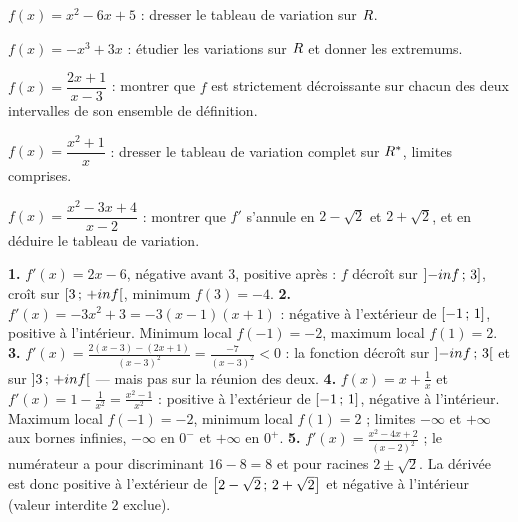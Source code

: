 \begin{entrainement}[variations]
\exo[\niveau{1}] $f(x) = x^{2}-6x+5$ : dresser le tableau de variation sur
$R$.

\exo[\niveau{2}] $f(x) = -x^{3}+3x$ : étudier les variations sur $R$ et
donner les extremums.

\exo[\niveau{2}] $f(x) = \dfrac{2x+1}{x-3}$ : montrer que $f$ est
strictement décroissante sur chacun des deux intervalles de son ensemble de
définition.

\exo[\niveau{3}] $f(x) = \dfrac{x^{2}+1}{x}$ : dresser le tableau de
variation complet sur $R^{*}$, limites comprises.

\exo[\niveau{3}] $f(x) = \dfrac{x^{2}-3x+4}{x-2}$ : montrer que $f'$ s'annule
en $2-\sqrt2$ et $2+\sqrt2$, et en déduire le tableau de variation.
\end{entrainement}

\begin{corrige}[variations]
\textbf{1.} $f'(x) = 2x-6$, négative avant $3$, positive après : $f$ décroît
sur $\left]-inf\,;\,3\right]$, croît sur $\left[3\,;\,+inf\right[$,
minimum $f(3) = -4$.
\textbf{2.} $f'(x) = -3x^{2}+3 = -3(x-1)(x+1)$ : négative à l'extérieur de
$\left[-1\,;\,1\right]$, positive à l'intérieur. Minimum local $f(-1) = -2$,
maximum local $f(1) = 2$.
\textbf{3.} $f'(x) = \frac{2(x-3)-(2x+1)}{(x-3)^{2}} = \frac{-7}{(x-3)^{2}}
< 0$ : la fonction décroît sur $\left]-inf\,;\,3\right[$ et sur
$\left]3\,;\,+inf\right[$ — mais pas sur la réunion des deux.
\textbf{4.} $f(x) = x+\frac1x$ et $f'(x) = 1-\frac{1}{x^{2}}
= \frac{x^{2}-1}{x^{2}}$ : positive à l'extérieur de $\left[-1\,;\,1\right]$,
négative à l'intérieur. Maximum local $f(-1) = -2$, minimum local
$f(1) = 2$ ; limites $-\infty$ et $+\infty$ aux bornes infinies, $-\infty$
en $0^{-}$ et $+\infty$ en $0^{+}$.
\textbf{5.} $f'(x) = \frac{x^{2}-4x+2}{(x-2)^{2}}$ ; le numérateur a pour
discriminant $16-8 = 8$ et pour racines $2\pm\sqrt2$. La dérivée est donc
positive à l'extérieur de $\left[2-\sqrt2\,;\,2+\sqrt2\right]$ et négative à
l'intérieur (valeur interdite $2$ exclue).
\end{corrige}

